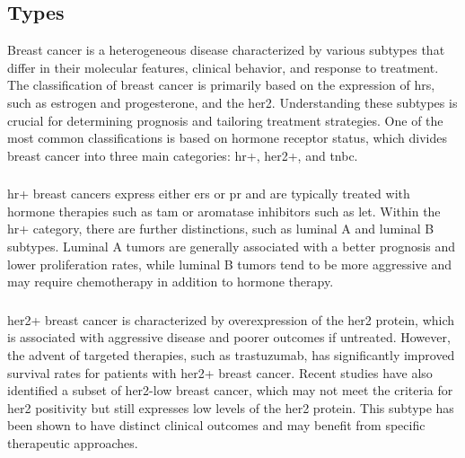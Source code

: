 \subsection{Types}
\label{sec:brca_types}

Breast cancer is a heterogeneous disease characterized by various subtypes that
differ in their molecular features, clinical behavior, and response to
treatment\supercite{harbeck_breast_2019}.
The classification of breast cancer is primarily based on the expression of
\glspl{hr}, such as estrogen and progesterone, and the \gls{her2}.
Understanding these subtypes is crucial for determining prognosis and tailoring
treatment strategies.
One of the most common classifications is based on hormone receptor status,
which divides breast cancer into three main categories: \gls{hr+}, \gls{her2+},
and \gls{tnbc}\supercite{clusan_basic_2023}.

\subsubsection{}
\gls{hr+} breast cancers express either \glspl{er} or \gls{pr} and
are typically treated with hormone therapies such as \gls{tam} or aromatase
inhibitors such as \gls{let}\supercite{geyer_molecular_2012}.
Within the \gls{hr+} category, there are further distinctions, such as luminal
A and luminal B subtypes.
Luminal A tumors are generally associated with a better prognosis and lower
proliferation rates, while luminal B tumors tend to be more aggressive and may
require chemotherapy in addition to hormone
therapy\supercite{geyer_molecular_2012}.

\subsubsection{}
\Gls{her2+} breast cancer is characterized by overexpression of the \gls{her2}
protein, which is associated with aggressive disease and poorer outcomes if
untreated.
However, the advent of targeted therapies, such as trastuzumab, has
significantly improved survival rates for patients with \gls{her2+} breast
cancer\supercite{modi_antitumor_2020}.
Recent studies have also identified a subset of \gls{her2}-low breast cancer,
which may not meet the criteria for \gls{her2} positivity but still expresses
low levels of the \gls{her2} protein.
This subtype has been shown to have distinct clinical outcomes and may benefit
from specific therapeutic
approaches\supercite{won_clinical_2022,mutai_prognostic_2021}.

